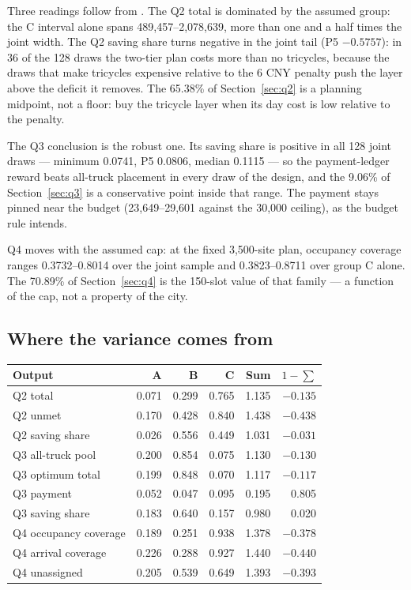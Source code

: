Three readings follow from . The Q2 total is dominated by the
assumed group: the C interval alone spans 489,457--2,078,639, more than one and a half
times the joint width. The Q2 saving share turns negative in the joint tail (P5 $-0.5757$): in 36 of the
128 draws the two-tier plan costs more than no tricycles, because the draws that make
tricycles expensive relative to the 6 CNY penalty push the layer above the deficit it
removes. The 65.38\% of Section~\ref{sec:q2} is a planning midpoint, not a floor: buy the
tricycle layer when its day cost is low relative to the penalty.

The Q3 conclusion is the robust one. Its saving share is positive in all 128 joint
draws --- minimum 0.0741, P5 0.0806, median 0.1115 --- so the payment-ledger reward
beats all-truck placement in every draw of the design, and the 9.06\% of
Section~\ref{sec:q3} is a conservative point inside that range. The payment stays pinned
near the budget (23,649--29,601 against the 30,000 ceiling), as the budget rule intends.

Q4 moves with the assumed cap: at the fixed 3,500-site plan, occupancy coverage ranges
0.3732--0.8014 over the joint sample and 0.3823--0.8711 over group C alone. The 70.89\%
of Section~\ref{sec:q4} is the 150-slot value of that family --- a function of the cap,
not a property of the city.

\subsection{Where the variance comes from}

\begin{center}
\scriptsize
\begin{tabular}{@{}lrrrrr@{}}
\toprule
\textbf{Output} & \textbf{A} & \textbf{B} & \textbf{C} & \textbf{Sum} &
\textbf{$1-\sum$} \\
\midrule
Q2 total & 0.071 & 0.299 & 0.765 & 1.135 & $-0.135$ \\
Q2 unmet & 0.170 & 0.428 & 0.840 & 1.438 & $-0.438$ \\
Q2 saving share & 0.026 & 0.556 & 0.449 & 1.031 & $-0.031$ \\
Q3 all-truck pool & 0.200 & 0.854 & 0.075 & 1.130 & $-0.130$ \\
Q3 optimum total & 0.199 & 0.848 & 0.070 & 1.117 & $-0.117$ \\
Q3 payment & 0.052 & 0.047 & 0.095 & 0.195 & 0.805 \\
Q3 saving share & 0.183 & 0.640 & 0.157 & 0.980 & 0.020 \\
Q4 occupancy coverage & 0.189 & 0.251 & 0.938 & 1.378 & $-0.378$ \\
Q4 arrival coverage & 0.226 & 0.288 & 0.927 & 1.440 & $-0.440$ \\
Q4 unassigned & 0.205 & 0.539 & 0.649 & 1.393 & $-0.393$ \\
\bottomrule
\end{tabular}
\end{center}

